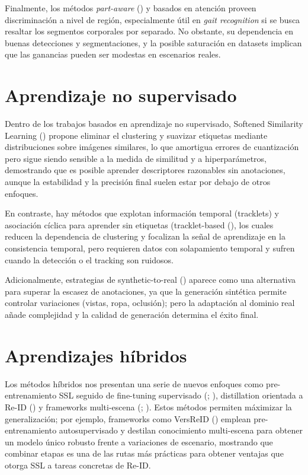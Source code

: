 Finalmente, los métodos \textit{part-aware} (\cite{Yang2020DevilDetails}) y basados en atención proveen discriminación a nivel de región, especialmente útil en \textit{gait recognition} si se busca resaltar los segmentos corporales por separado. No obstante, su dependencia en buenas detecciones y segmentaciones, y la posible saturación en datasets implican que las ganancias pueden ser modestas en escenarios reales.

\section{Aprendizaje no supervisado}

Dentro de los trabajos basados en aprendizaje no supervisado, Softened Similarity Learning (\cite{Lin2020Softened}) propone eliminar el clustering y suavizar etiquetas mediante distribuciones sobre imágenes similares, lo que amortigua errores de cuantización pero sigue siendo sensible a la medida de similitud y a hiperparámetros, demostrando que es posible aprender descriptores razonables sin anotaciones, aunque la estabilidad y la precisión final suelen estar por debajo de otros enfoques.

En contraste, hay métodos que explotan información temporal (tracklets) y asociación cíclica para aprender sin etiquetas (tracklet-based (\cite{Wu2020Tracklet}), los cuales reducen la dependencia de clustering y focalizan la señal de aprendizaje en la consistencia temporal, pero requieren datos con solapamiento temporal y sufren cuando la detección o el tracking son ruidosos. 

Adicionalmente, estrategias de synthetic-to-real (\cite{Zhang2024SyntheticReID}) aparece como una alternativa para superar la escasez de anotaciones, ya que la generación sintética permite controlar variaciones (vistas, ropa, oclusión); pero la adaptación al dominio real añade complejidad y la calidad de generación determina el éxito final.

\section{Aprendizajes híbridos}

Los métodos híbridos nos presentan una serie de nuevos enfoques como pre-entrenamiento SSL seguido de fine-tuning supervisado (\cite{Dou2023IdentitySeeking}; \cite{Huang2025PersonViT}), distillation orientada a Re-ID (\cite{Li2025OrientedKD}) y frameworks multi-escena (\cite{Liu2025UCMVeID}; \cite{Rao2024MSFFT}). Estos métodos permiten máximizar la generalización; por ejemplo, frameworks como VersReID (\cite{Zhou2024VersReID}) emplean pre-entrenamiento autosupervisado y destilan conocimiento multi-escena para obtener un modelo único robusto frente a variaciones de escenario, mostrando que combinar etapas es una de las rutas más prácticas para obtener ventajas que otorga SSL a tareas concretas de Re-ID.

